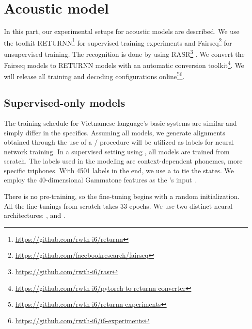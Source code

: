 \section{Acoustic model}
\label{ch: Acoustic_model}


In this part, our experimental setups for acoustic models are described.
We use the toolkit 
RETURNN\footnote{\href{https://github.com/rwth-i6/returnn}{https://github.com/rwth-i6/returnn}} \cite{doetsch2016returnn}
for supervised training experiments and
Fairseq\footnote{\href{https://github.com/facebookresearch/fairseq}{https://github.com/facebookresearch/fairseq}} \cite{facebook2019fairseq}
for unsupervised  training.
The recognition is done by using
RASR\footnote{\href{https://github.com/rwth-i6/rasr}{https://github.com/rwth-i6/rasr}} \cite{rybach2011rasr}.
We convert the Fairseq models to RETURNN models with an automatic
conversion toolkit\footnote{\href{https://github.com/rwth-i6/pytorch-to-returnn-converter}{https://github.com/rwth-i6/pytorch-to-returnn-converter}}.
We will release all training and decoding configurations
online\footnote{\href{https://github.com/rwth-i6/returnn-experiments}{https://github.com/rwth-i6/returnn-experiments}}\footnote{\href{https://github.com/rwth-i6/i6-experiments}{https://github.com/rwth-i6/i6-experiments}}.


\subsection{Supervised-only models}

The training schedule for Vietnamese language's basic systems
are similar and simply differ in the specifics. Assuming all models, we generate alignments obtained through the use of a / procedure will be utilized as labels for neural network training.
In a supervised setting using , all models are trained from scratch. The labels used in the  modeling are context-dependent phonemes, more specific triphones.
With 4501  labels in the end, we use a  to tie the states. 
We employ the 40-dimensional Gammatone features as the 's input \cite{schlueter:icassp07}. 

There is no pre-training, so the fine-tuning begins with a random initialization.
All the fine-tunings from scratch takes 33 epochs.
We use two distinct neural  architectures:  \cite{Transformer}, and  \cite{hochreiter1997long}. 

